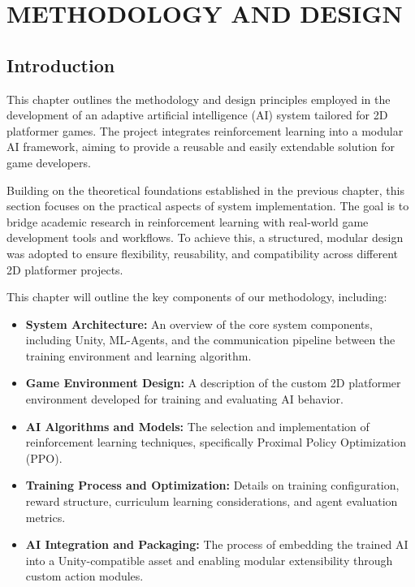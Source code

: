 \documentclass[12pt,oneside,openright,a4paper]{cpe-english-project}
\begin{document}
\chapter{METHODOLOGY AND DESIGN}

\section{Introduction}

This chapter outlines the methodology and design principles employed in the development of an adaptive artificial intelligence (AI) system tailored for 2D platformer games. The project integrates reinforcement learning into a modular AI framework, aiming to provide a reusable and easily extendable solution for game developers.\par

Building on the theoretical foundations established in the previous chapter, this section focuses on the practical aspects of system implementation. The goal is to bridge academic research in reinforcement learning with real-world game development tools and workflows. To achieve this, a structured, modular design was adopted to ensure flexibility, reusability, and compatibility across different 2D platformer projects.\par

This chapter will outline the key components of our methodology, including:
\begin{itemize}
\item \textbf{System Architecture:} An overview of the core system components, including Unity, ML-Agents, and the communication pipeline between the training environment and learning algorithm.
\item \textbf{Game Environment Design:} A description of the custom 2D platformer environment developed for training and evaluating AI behavior.
\item \textbf{AI Algorithms and Models:} The selection and implementation of reinforcement learning techniques, specifically Proximal Policy Optimization (PPO).
\item \textbf{Training Process and Optimization:} Details on training configuration, reward structure, curriculum learning considerations, and agent evaluation metrics.
\item \textbf{AI Integration and Packaging:} The process of embedding the trained AI into a Unity-compatible asset and enabling modular extensibility through custom action modules.
\end{itemize}
\end{document}
